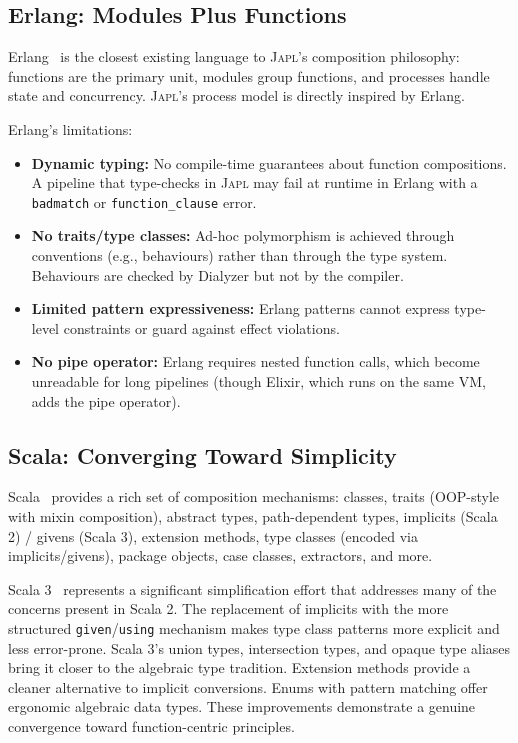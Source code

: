 \documentclass[11pt,a4paper]{article}
\newcommand{\japl}{\textsc{Japl}}
\begin{document}
\subsection{Erlang: Modules Plus Functions}

Erlang~\citep{armstrong2007programming} is the closest existing language to \japl{}'s composition philosophy: functions are the primary unit, modules group functions, and processes handle state and concurrency. \japl{}'s process model is directly inspired by Erlang.

Erlang's limitations:
\begin{itemize}
  \item \textbf{Dynamic typing:} No compile-time guarantees about function compositions. A pipeline that type-checks in \japl{} may fail at runtime in Erlang with a \texttt{badmatch} or \texttt{function\_clause} error.
  \item \textbf{No traits/type classes:} Ad-hoc polymorphism is achieved through conventions (e.g., behaviours) rather than through the type system. Behaviours are checked by Dialyzer but not by the compiler.
  \item \textbf{Limited pattern expressiveness:} Erlang patterns cannot express type-level constraints or guard against effect violations.
  \item \textbf{No pipe operator:} Erlang requires nested function calls, which become unreadable for long pipelines (though Elixir, which runs on the same VM, adds the pipe operator).
\end{itemize}

\subsection{Scala: Converging Toward Simplicity}

Scala~\citep{odersky2004scala} provides a rich set of composition mechanisms: classes, traits (OOP-style with mixin composition), abstract types, path-dependent types, implicits (Scala 2) / givens (Scala 3), extension methods, type classes (encoded via implicits/givens), package objects, case classes, extractors, and more.

Scala 3~\citep{odersky2021scala3} represents a significant simplification effort that addresses many of the concerns present in Scala 2. The replacement of implicits with the more structured \texttt{given}/\texttt{using} mechanism makes type class patterns more explicit and less error-prone. Scala 3's union types, intersection types, and opaque type aliases bring it closer to the algebraic type tradition. Extension methods provide a cleaner alternative to implicit conversions. Enums with pattern matching offer ergonomic algebraic data types. These improvements demonstrate a genuine convergence toward function-centric principles.
\end{document}

